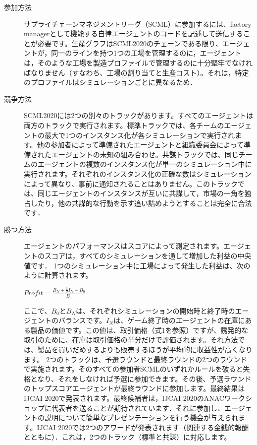 \documentclass[12pt]{jarticle}
\begin{document}
\begin{description}
  \item[参加方法] サプライチェーンマネジメントリーグ（SCML）に参加するには、factory managerとして機能する自律エージェントのコードを記述して送信することが必要です。生産グラフはSCML2020のチェーンである限り、エージェントが，同一のラインを持つ1つの工場を管理するのに，エージェントは，そのような工場を製造プロファイルで管理するのに十分堅牢でなければなりません（すなわち、工場の割り当てと生産コスト）。それは，特定のプロファイルはシミュレーションごとに異なるため．
  \item[競争方法] SCML2020には2つの別々のトラックがあります。すべてのエージェントは両方のトラックで実行されます。標準トラックでは、各チームのエージェントの最大で1つのインスタンス化が各シミュレーションで実行されます。他の参加者によって準備されたエージェントと組織委員会によって準備されたエージェントの未知の組み合わせ。共謀トラックでは、同じチームのエージェントの複数のインスタンス化が単一のシミュレーション中に実行されます。それぞれのインスタンス化の正確な数はシミュレーションによって異なり、事前に通知されることはありません。このトラックでは、同じエージェントのインスタンスが互いに共謀して，市場の一角を独占したり，他の共謀的な行動を示す追い詰めようとすることは完全に合法です．
  \item[勝つ方法] エージェントのパフォーマンスはスコアによって測定されます。エージェントのスコアは，すべてのシミュレーションを通して増加した利益の中央値です．
  1つのシミュレーション中に工場によって発生した利益は、次のように計算されます。

  $Profit = \frac{B_N + \frac{1}{2}I_N - B_0}{B_0}$

  ここで、$B_0$と$B_N$は、それぞれシミュレーションの開始時と終了時のエージェントのバランスです。$I_N$は、ゲーム終了時のエージェントの在庫にある製品の価値です。この値は、取引価格（式1を参照）ですが、誘発的な取引のために、在庫は取引価格の半分だけで評価されます。それ方法では、製品を買いだめするよりも販売するほうが平均的に収益性が高くなります。
  2つのトラックは、予選ラウンドと最終ラウンドの2つのラウンドで実施されます。そのすべての参加者SCMLのいずれかルールを破ると失格となり、それをしなければ予選に参加できます。その後、予選ラウンドのトップスコアエージェントが最終ラウンドに参加します。最終結果はIJCAI 2020で発表されます。最終候補者は，IJCAI 2020のANACワークショップに代表者を送ることが期待されています．それに参加し、エージェントの説明について簡単なプレゼンテーションを行う機会が与えられます。IJCAI 2020では2つのアワードが発表されます（関連する金銭的報酬とともに）．これは，2つのトラック（標準と共謀）に対応します。
\end{description} 
\end{document}
